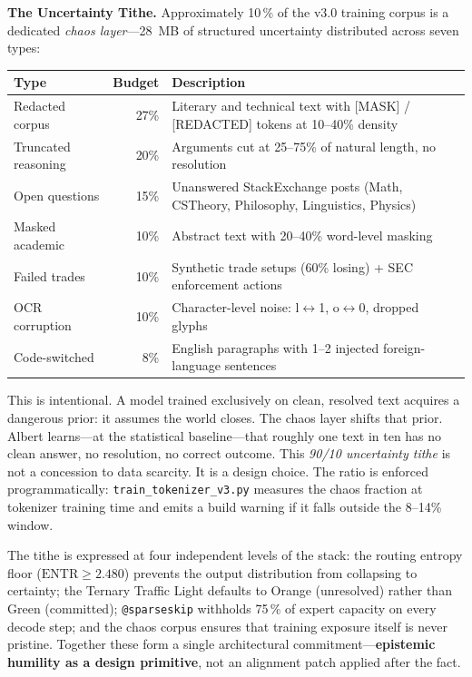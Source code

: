 \documentclass[journal,10pt,twocolumn]{IEEEtran}
\begin{document}
\textbf{The Uncertainty Tithe.}
Approximately 10\,\% of the v3.0 training corpus is a dedicated
\emph{chaos layer}---28~MB of structured uncertainty distributed across
seven types:

\begin{center}
\small
\renewcommand{\arraystretch}{1.2}
\begin{tabular}{p{3.0cm}rp{3.8cm}}
\toprule
Type & Budget & Description \\
\midrule
Redacted corpus    & 27\% & Literary and technical text with [MASK] / [REDACTED] tokens at 10--40\% density \\
Truncated reasoning & 20\% & Arguments cut at 25--75\% of natural length, no resolution \\
Open questions     & 15\% & Unanswered StackExchange posts (Math, CSTheory, Philosophy, Linguistics, Physics) \\
Masked academic    & 10\% & Abstract text with 20--40\% word-level masking \\
Failed trades      & 10\% & Synthetic trade setups (60\% losing) + SEC enforcement actions \\
OCR corruption     & 10\% & Character-level noise: l$\leftrightarrow$1, o$\leftrightarrow$0, dropped glyphs \\
Code-switched      &  8\% & English paragraphs with 1--2 injected foreign-language sentences \\
\bottomrule
\end{tabular}
\end{center}

\noindent This is intentional. A model trained exclusively on clean, resolved
text acquires a dangerous prior: it assumes the world closes. The chaos layer
shifts that prior. Albert learns---at the statistical baseline---that roughly
one text in ten has no clean answer, no resolution, no correct outcome. This
\emph{90/10 uncertainty tithe} is not a concession to data scarcity. It is a
design choice. The ratio is enforced programmatically: \texttt{train\_tokenizer\_v3.py}
measures the chaos fraction at tokenizer training time and emits a build
warning if it falls outside the 8--14\% window.

The tithe is expressed at four independent levels of the stack: the routing
entropy floor ($\text{ENTR} \geq 2.480$) prevents the output distribution
from collapsing to certainty; the Ternary Traffic Light defaults to Orange
(unresolved) rather than Green (committed); \texttt{@sparseskip} withholds
75\,\% of expert capacity on every decode step; and the chaos corpus ensures
that training exposure itself is never pristine. Together these form a single
architectural commitment---\textbf{epistemic humility as a design primitive},
not an alignment patch applied after the fact.
\end{document}
